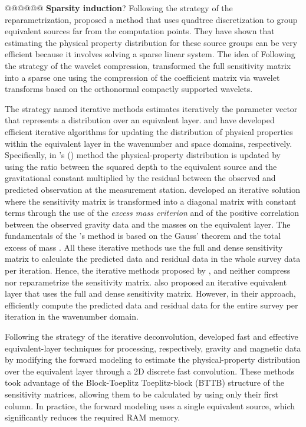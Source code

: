 @@@@@@ \textbf{Sparsity induction}?
Following the strategy of the reparametrization, 
\cite{barnes-lumley2011} proposed a method that uses quadtree discretization to group equivalent sources far from the computation points.
They have shown that estimating the physical property distribution for these source groups can be very efficient because
it involves solving a sparse linear system.
The idea of 
Following the strategy of the  wavelet compression, \cite{li-oldenburg2010} transformed the full sensitivity matrix into a sparse one using the compression of the coefficient matrix via wavelet transforms based on the orthonormal compactly supported wavelets. 

The strategy named iterative methods estimates iteratively the parameter vector that represents a distribution over an equivalent layer.
\cite{xia-sprowl1991} and \cite{xia-etal1993} have developed efficient iterative algorithms 
for updating the distribution of physical properties within the equivalent layer in the wavenumber and space domains, respectively.
Specifically, in \citeauthor{xia-sprowl1991}'s (\citeyear{xia-sprowl1991}) method the physical-property distribution is updated by using the ratio between the squared depth to the equivalent source and the gravitational constant multiplied by the residual between the observed and predicted observation at the measurement station. 
\cite{siqueira-etal2017} developed an iterative solution where the sensitivity matrix is transformed into a diagonal matrix with constant terms through the use of the \textit{excess mass criterion} and of the positive correlation between the observed gravity data and the masses on the equivalent layer.
The fundamentals of the \citeauthor{siqueira-etal2017}'s method
is  based on the Gauss' theorem \cite[e.g.,][p. 43]{kellogg1967} and the total excess of mass \cite[e.g.,][p. 60]{blakely1996}.
All these iterative methods use the full and dense sensitivity matrix to calculate the predicted data 
and residual data in the whole survey data per iteration.
Hence, the iterative methods proposed by \cite{xia-sprowl1991}, \cite{xia-etal1993} and 
\cite{siqueira-etal2017} neither compress nor reparametrize the sensitivity  matrix.
\cite{jirigalatu-ebbing2019} also proposed an iterative equivalent layer that uses the full and dense sensitivity matrix. 
However, in their approach, \cite{jirigalatu-ebbing2019}  efficiently compute  the predicted data and 
residual data for the entire survey per iteration in the wavenumber domain.

Following the strategy of the  iterative deconvolution, \citet{takahashi-etal2020,takahashi-etal2022}
developed fast and effective equivalent-layer techniques for processing, respectively, gravity and magnetic data by modifying the forward modeling to 
estimate the physical-property distribution over the equivalent layer through a 2D discrete fast convolution.
These methods took advantage of the Block-Toeplitz Toeplitz-block (BTTB) structure of the sensitivity matrices, allowing them to be calculated by 
using only their first column.
In practice, the forward modeling uses a single equivalent source, which significantly reduces the required RAM memory. 

